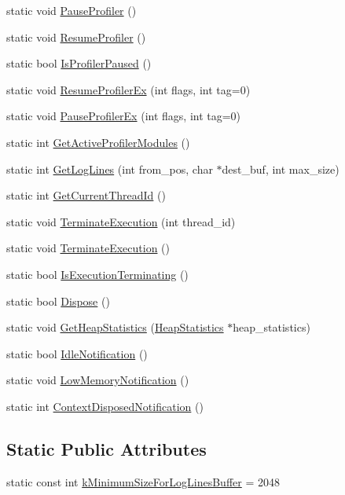\begin{DoxyCompactItemize}
\item 
static void \hyperlink{classv8_1_1_v8_a5fefebea0cd37105837a9d267baf2e5c}{Pause\+Profiler} ()
\item 
static void \hyperlink{classv8_1_1_v8_ab0557aaba62c7fb253fe838003aa60af}{Resume\+Profiler} ()
\item 
static bool \hyperlink{classv8_1_1_v8_aa8dc5a7c3a059bb376882ac36b9df775}{Is\+Profiler\+Paused} ()
\item 
static void \hyperlink{classv8_1_1_v8_affe7a421288278719a71928d3b9c4836}{Resume\+Profiler\+Ex} (int flags, int tag=0)
\item 
static void \hyperlink{classv8_1_1_v8_a8078e3c6e4d38ef6e9142b76b0420d4e}{Pause\+Profiler\+Ex} (int flags, int tag=0)
\item 
static int \hyperlink{classv8_1_1_v8_a94e8ce52e976b58d5cbdb23d2abe894e}{Get\+Active\+Profiler\+Modules} ()
\item 
static int \hyperlink{classv8_1_1_v8_ac7e91e25ed7773db1f31413fb726bca7}{Get\+Log\+Lines} (int from\+\_\+pos, char $\ast$dest\+\_\+buf, int max\+\_\+size)
\item 
static int \hyperlink{classv8_1_1_v8_a6b73813e84728c2a91f61ef45e48d80c}{Get\+Current\+Thread\+Id} ()
\item 
static void \hyperlink{classv8_1_1_v8_af7d845e6f55eb76085d5ff3601780986}{Terminate\+Execution} (int thread\+\_\+id)
\item 
static void \hyperlink{classv8_1_1_v8_a7b09bb56f4effb91e1de4398c8fd43f2}{Terminate\+Execution} ()
\item 
static bool \hyperlink{classv8_1_1_v8_aeeffbebf5f753286eda3db8f14908ad7}{Is\+Execution\+Terminating} ()
\item 
static bool \hyperlink{classv8_1_1_v8_a566450d632c0a63770682b9da3cae08d}{Dispose} ()
\item 
static void \hyperlink{classv8_1_1_v8_a63e014365648e568ae47b8a849dfc992}{Get\+Heap\+Statistics} (\hyperlink{classv8_1_1_heap_statistics}{Heap\+Statistics} $\ast$heap\+\_\+statistics)
\item 
static bool \hyperlink{classv8_1_1_v8_af4ac685c915acf6325daafa70bae9835}{Idle\+Notification} ()
\item 
static void \hyperlink{classv8_1_1_v8_a7df118b9667d04903f8e9fb7452fd1ac}{Low\+Memory\+Notification} ()
\item 
static int \hyperlink{classv8_1_1_v8_a06126bd2345c086a376f934ec1fbcce6}{Context\+Disposed\+Notification} ()
\end{DoxyCompactItemize}
\subsection*{Static Public Attributes}
\begin{DoxyCompactItemize}
\item 
static const int \hyperlink{classv8_1_1_v8_a2bdde078c68d2820262925687b962553}{k\+Minimum\+Size\+For\+Log\+Lines\+Buffer} = 2048
\end{DoxyCompactItemize}
